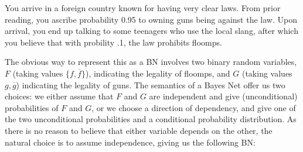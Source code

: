 \documentclass{article}
\theoremstyle{plain}
\theoremstyle{definition}
\newenvironment{example}
	{\pushQED{\qed}\renewcommand{\qedsymbol}{$\triangle$}\examplex}
	{\popQED\endexamplex%
}
\theoremstyle{remark}
\numberwithin{equation}{section}
\begin{document}
\begin{example}
		\label{ex:guns-and-floomps}
You arrive in a foreign country known for having very clear laws. From
prior reading, you ascribe probability 0.95 to owning guns being
against the law. Upon arrival, you end up talking to some teenagers
who use the local slang, after which you believe that with probility
.1, the law prohibits floomps.  
		
		The obvious way to represent this as a BN involves two
                binary random variables, $F$ (taking values $\{f,
                \overline f\}$), indicating the legality of floomps,
                and $G$ (taking values $g, \overline g$) indicating
                the legality of guns. The semantics of a Bayes Net
                offer us two choices: we either assume that $F$ and
                $G$ are independent and give (unconditional)
                probabilities of $F$ and $G$, or we choose a direction
                of dependency, 
   and give one of the two unconditional probabilities and a conditional probability distribution. As there is no reason to believe that either variable depends on the other, the natural choice is to assume independence, giving us the following BN:
		
		
		\begin{center}
		\end{center}



\end{example}
\end{document}
